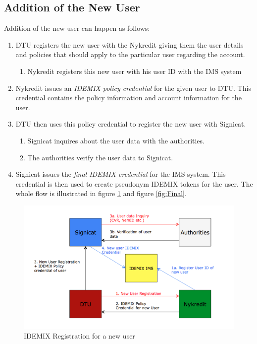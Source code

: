 \subsection{Addition of the New User}
Addition of the new user can happen as follows:
\begin{enumerate}
	\item DTU registers the new user with the Nykredit giving them the user details and policies that should apply to the particular user regarding the account. 
	\begin{enumerate}
		\item Nykredit registers this new user with his user ID with the IMS system
	\end{enumerate}
	\item Nykredit issues an \textit{IDEMIX policy credential} for the given user to DTU. This credential contains the policy information and account information for the user.
	\item DTU then uses this policy credential to register the new user with Signicat. 
	\begin{enumerate}
		\item Signicat inquires about the user data with the authorities.
		\item The authorities verify the user data to Signicat.
	\end{enumerate}
	\item Signicat issues the \textit{final IDEMIX credential} for the IMS system. This credential is then used to create pseudonym IDEMIX tokens for the user. 
	The whole flow is illustrated in figure \ref{fig:IDEMIX-Real} and figure \ref{fig:Final}.
\end{enumerate}
\begin{figure}[h]
	\centering
	\includegraphics[width=\textwidth]{figures/IDEMIX-Real}
	\caption{IDEMIX Registration for a new user}
	\label{fig:IDEMIX-Real}
\end{figure}
